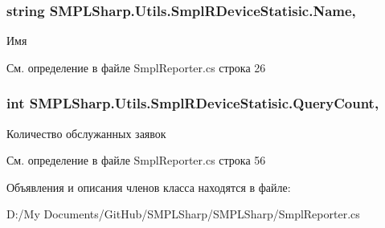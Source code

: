 \hypertarget{class_s_m_p_l_sharp_1_1_utils_1_1_smpl_r_device_statisic_a7a9601632b7585ab8df008cd59698f0d}{
\subsubsection[{Name}]{\setlength{\rightskip}{0pt plus 5cm}string S\-M\-P\-L\-Sharp.\-Utils.\-Smpl\-R\-Device\-Statisic.\-Name\hspace{0.3cm}{\ttfamily [get]}, {\ttfamily [set]}}}\label{d7/d3b/class_s_m_p_l_sharp_1_1_utils_1_1_smpl_r_device_statisic_a7a9601632b7585ab8df008cd59698f0d}


Имя 



См. определение в файле Smpl\-Reporter.\-cs строка 26

\hypertarget{class_s_m_p_l_sharp_1_1_utils_1_1_smpl_r_device_statisic_ac8c73d6bf105ba2983b1160b4b037cef}{
\subsubsection[{Query\-Count}]{\setlength{\rightskip}{0pt plus 5cm}int S\-M\-P\-L\-Sharp.\-Utils.\-Smpl\-R\-Device\-Statisic.\-Query\-Count\hspace{0.3cm}{\ttfamily [get]}, {\ttfamily [set]}}}\label{d7/d3b/class_s_m_p_l_sharp_1_1_utils_1_1_smpl_r_device_statisic_ac8c73d6bf105ba2983b1160b4b037cef}


Количество обслужанных заявок 



См. определение в файле Smpl\-Reporter.\-cs строка 56



Объявления и описания членов класса находятся в файле\-:\begin{DoxyCompactItemize}
\item 
D\-:/\-My Documents/\-Git\-Hub/\-S\-M\-P\-L\-Sharp/\-S\-M\-P\-L\-Sharp/Smpl\-Reporter.\-cs\end{DoxyCompactItemize}
